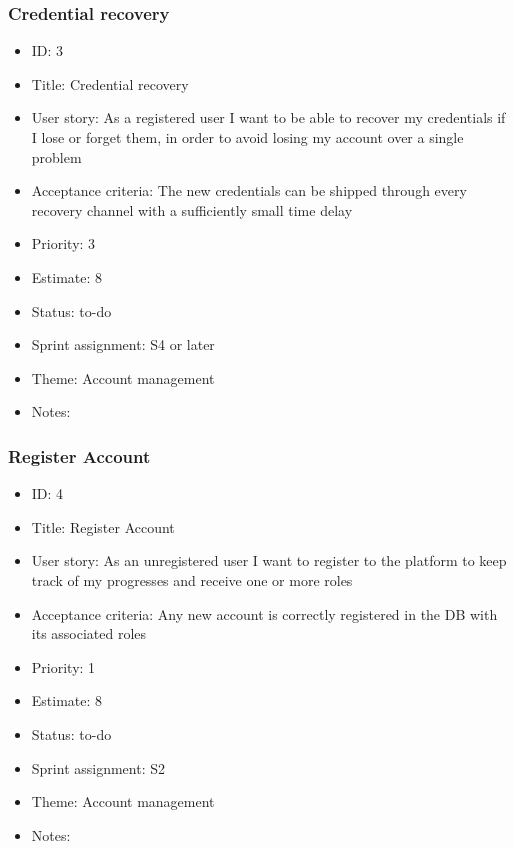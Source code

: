 \subsubsection{Credential recovery}
\begin{itemize}
	\item ID: 3
	\item Title: Credential recovery
	\item User story: As a registered user I want to be able to recover my credentials if I lose or forget them, in order to avoid losing my account over a single problem
	\item Acceptance criteria: The new credentials can be shipped through every recovery channel with a sufficiently small time delay
	\item Priority: 3
	\item Estimate: 8
	\item Status: to-do
	\item Sprint assignment: S4 or later
	\item Theme: Account management
	\item Notes:
\end{itemize}

\subsubsection{Register Account}
\begin{itemize}
	\item ID: 4
	\item Title: Register Account
	\item User story: As an unregistered user I want to register to the platform to keep track of my progresses and receive one or more roles
	\item Acceptance criteria: Any new account is correctly registered in the DB with its associated roles
	\item Priority: 1
	\item Estimate: 8
	\item Status: to-do
	\item Sprint assignment: S2
	\item Theme: Account management
	\item Notes:
\end{itemize}

